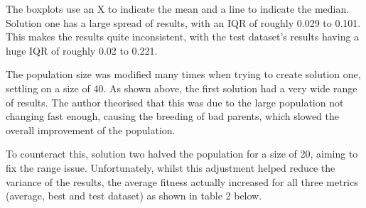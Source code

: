 \documentclass[sigconf]{acmart}
\begin{document}
The boxplots use an X to indicate the mean and a line to indicate the median. Solution one has a large spread of results, with an IQR of roughly 0.029 to 0.101. This makes the results quite inconsistent, with the test dataset's results having a huge IQR of roughly 0.02 to 0.221.

The population size was modified many times when trying to create solution one, settling on a size of 40. As shown above, the first solution had a very wide range of results. The author theorised that this was due to the large population not changing fast enough, causing the breeding of bad parents, which slowed the overall improvement of the population.

To counteract this, solution two halved the population for a size of 20, aiming to fix the range issue. Unfortunately, whilst this adjustment helped reduce the variance of the results, the average fitness actually increased for all three metrics (average, best and test dataset) as shown in table 2 below.
\end{document}
